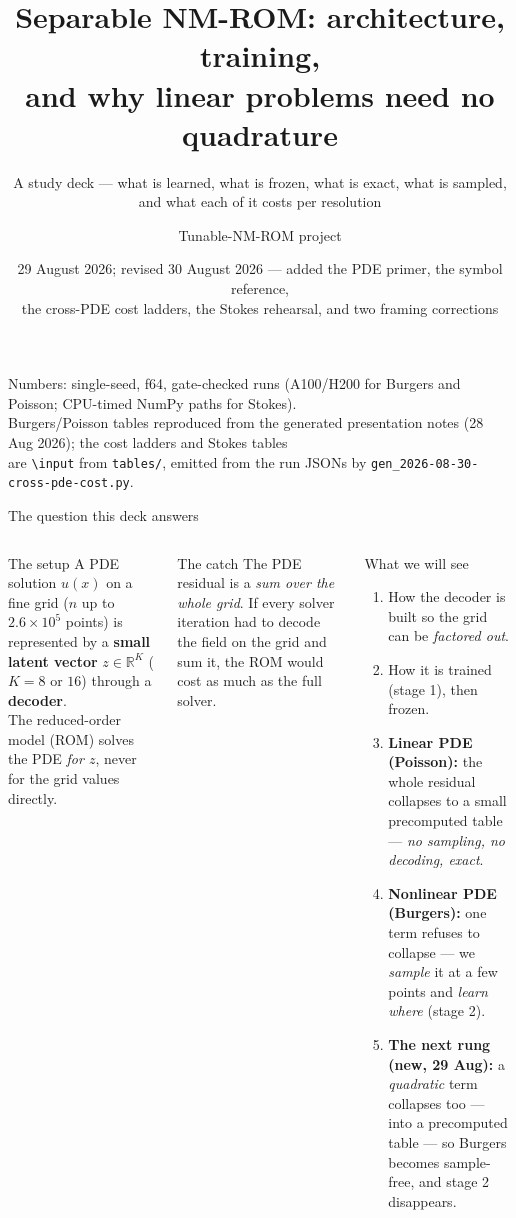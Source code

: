 \documentclass[10pt,aspectratio=169]{beamer}
\title{Separable NM-ROM: architecture, training,\\ and why linear problems need no quadrature}
\subtitle{A study deck --- what is learned, what is frozen, what is exact, what is sampled,\\ and what each of it costs per resolution}
\author{Tunable-NM-ROM project}
\date{29 August 2026; revised 30 August 2026 --- added the PDE primer, the symbol reference,\\ the cross-PDE cost ladders, the Stokes rehearsal, and two framing corrections}
\newcommand{\R}{\mathbb{R}}
\begin{document}
\begin{frame}
  \titlepage
  \begin{center}\scriptsize
    Numbers: single-seed, f64, gate-checked runs (A100/H200 for Burgers and Poisson; CPU-timed NumPy paths for Stokes).\\
    Burgers/Poisson tables reproduced from the generated presentation notes (28 Aug 2026); the cost ladders and Stokes tables\\
    are \texttt{\textbackslash input} from \texttt{tables/}, emitted from the run JSONs by \texttt{gen\_2026-08-30-cross-pde-cost.py}.
  \end{center}
\end{frame}

\begin{frame}{The question this deck answers}
  \begin{columns}[T]
    \begin{block}{The setup}
      A PDE solution $u(x)$ on a fine grid ($n$ up to $2.6\times10^{5}$ points) is represented by a
      \textbf{small latent vector} $z\in\R^{K}$ ($K=8$ or $16$) through a \textbf{decoder}.\\[2pt]
      The reduced-order model (ROM) solves the PDE \emph{for $z$}, never for the grid values directly.
    \end{block}
    \begin{block}{The catch}
      The PDE residual is a \emph{sum over the whole grid}. If every solver iteration had to decode
      the field on the grid and sum it, the ROM would cost as much as the full solver.
    \end{block}
    \begin{alertblock}{What we will see}
      \begin{enumerate}
        \item How the decoder is built so the grid can be \emph{factored out}.
        \item How it is trained (stage 1), then frozen.
        \item \textbf{Linear PDE (Poisson):} the whole residual collapses to a small precomputed table --- \emph{no sampling, no decoding, exact}.
        \item \textbf{Nonlinear PDE (Burgers):} one term refuses to collapse --- we \emph{sample} it at a few points and \emph{learn where} (stage 2).
        \item \textbf{The next rung (new, 29 Aug):} a \emph{quadratic} term collapses too --- into a precomputed table --- so Burgers becomes sample-free, and stage 2 disappears.
      \end{enumerate}
    \end{alertblock}
  \end{columns}
\end{frame}
\end{document}
